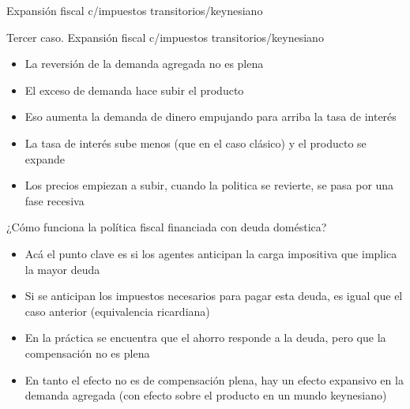 \documentclass{beamer}
\begin{document}
\begin{frame}{Expansión fiscal c/impuestos transitorios/keynesiano}
\begin{center}
\begin{figure}[H]
\begin{center}
\begin{minipage}[b]{0.45\textwidth}
\begin{center}
\end{center}
    \end{minipage}
\end{center}
\vspace{0.7cm}
\label{fig:C36.4}
\end{figure}
\end{center} 

\end{frame}

\begin{frame}{Tercer caso. Expansión fiscal c/impuestos transitorios/keynesiano}
   
\begin{itemize}
    \item La reversión de la demanda agregada no es plena
    \item El exceso de demanda hace subir el producto 
    \item Eso aumenta la demanda de dinero empujando para arriba la tasa de interés 
    \item La tasa de interés sube menos (que en el caso clásico) y el producto se expande 
    \item Los precios empiezan  a subir, cuando la politica se revierte, se pasa por una fase recesiva 
\end{itemize}
    
\end{frame}




\begin{frame}{¿Cómo funciona la política fiscal financiada con deuda doméstica?}

    \begin{itemize}
    \item Acá el punto clave es si los agentes anticipan la carga impositiva que implica la mayor deuda
    \item Si se anticipan los impuestos necesarios para pagar esta deuda, es igual que el caso anterior (equivalencia ricardiana)
    \item En la práctica se encuentra que el ahorro responde a la deuda, pero que la compensación no es plena
    \item En tanto el efecto no es de compensación plena, hay un efecto expansivo en la demanda agregada (con efecto sobre el producto en un mundo keynesiano)

    \end{itemize}

\end{frame}
\end{document}
